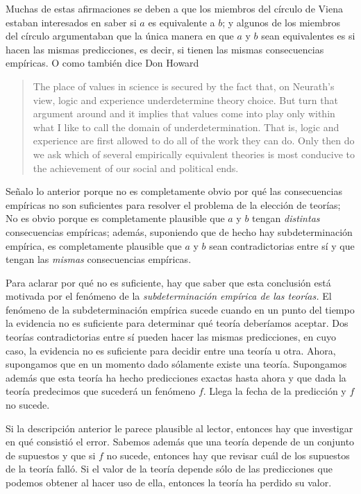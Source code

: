 Muchas de estas afirmaciones se deben a que los miembros del círculo de Viena estaban interesados en saber si $a$ es equivalente a $b$;
y algunos de los miembros del círculo argumentaban que la única manera en que $a$ y $b$ sean equivalentes es si hacen las mismas predicciones, es decir, si tienen las mismas consecuencias empíricas.
O como también dice Don Howard

\begin{quote}
	The place of values in science is secured by the fact that, on Neurath's view, logic and experience underdetermine theory choice.
	But turn that argument around and it implies that values come into play only within what I like to call the domain of underdetermination. 
	That is, logic and experience are first allowed to do all of the work they can do. 
	Only then do we ask which of several empirically equivalent theories is most conducive to the achievement of our social and political ends. \parencite[p.~10]{Howard2006}
\end{quote}

Señalo lo anterior porque no es completamente obvio por qué las consecuencias empíricas no son suficientes para resolver el problema de la elección de teorías;
No es obvio porque es completamente plausible que $a$ y $b$ tengan \emph{distintas} consecuencias empíricas;
además, suponiendo que de hecho hay subdeterminación empírica, es completamente plausible que $a$ y $b$ sean contradictorias entre sí y que tengan las \emph{mismas} consecuencias empíricas.

Para aclarar por qué no es suficiente, hay que saber que esta conclusión está motivada por el fenómeno de la \emph{subdeterminación empírica de las teorías.}
El fenómeno de la subdeterminación empírica sucede cuando en un punto del tiempo la evidencia no es suficiente para determinar qué teoría deberíamos aceptar.
Dos teorías contradictorias entre sí pueden hacer las mismas predicciones, en cuyo caso, la evidencia no es suficiente para decidir entre una teoría u otra.
Ahora, supongamos que en un momento dado sólamente existe una teoría.
Supongamos además que esta teoría ha hecho predicciones exactas hasta ahora y que dada la teoría predecimos que sucederá un fenómeno $f$.
Llega la fecha de la predicción y $f$ no sucede.

Si la descripción anterior le parece plausible al lector, entonces hay que investigar en qué consistió el error.
Sabemos además que una teoría depende de un conjunto de supuestos y que si $f$ no sucede, entonces hay que revisar cuál de los supuestos de la teoría falló.
Si el valor de la teoría depende sólo de las predicciones que podemos obtener al hacer uso de ella, entonces la teoría ha perdido su valor.

